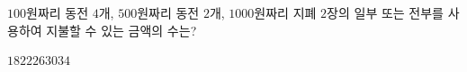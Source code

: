 $100$원짜리 동전 $4$개, $500$원짜리 동전 $2$개, $1000$원짜리 지폐 $2$장의 일부 또는 전부를 사용하여 지불할 수 있는 금액의 수는? 
\begin{choices32}{$18$}{$22$}{$26$}{$30$}{$34$}\end{choices32}
